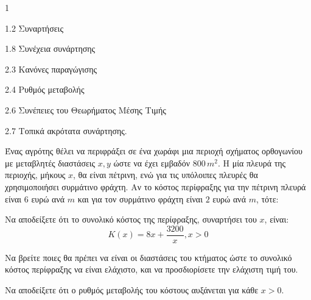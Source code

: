 \begin{ylh}{1}
    \item 1.2 Συναρτήσεις
    \item 1.8 Συνέχεια συνάρτησης
    \item 2.3 Κανόνες παραγώγισης
    \item 2.4 Ρυθμός μεταβολής
    \item 2.6 Συνέπειες του Θεωρήματος Μέσης Τιμής
    \item 2.7 Τοπικά ακρότατα συνάρτησης.
\end{ylh}
Ένας αγρότης θέλει να περιφράξει σε ένα χωράφι μια περιοχή σχήματος ορθογωνίου με μεταβλητές διαστάσεις $x, y$ ώστε να έχει εμβαδόν $800 \, m^2$. Η μία πλευρά της περιοχής, μήκους $x$, θα είναι πέτρινη, ενώ για τις υπόλοιπες πλευρές θα χρησιμοποιήσει συρμάτινο φράχτη. Αν το κόστος περίφραξης για την πέτρινη πλευρά είναι $6$ ευρώ ανά $m$ και για τον συρμάτινο φράχτη είναι $2$ ευρώ ανά $m$, τότε:
\begin{alist}
\item Να αποδείξετε ότι το συνολικό κόστος της περίφραξης, συναρτήσει του $x$, είναι:
\[ K(x) = 8x + \frac{3200}{x}, x > 0 \] 
\item Να βρείτε ποιες θα πρέπει να είναι οι διαστάσεις του κτήματος ώστε το συνολικό κόστος περίφραξης να είναι ελάχιστο, και να προσδιορίσετε την ελάχιστη τιμή του. 
\item Να αποδείξετε ότι ο ρυθμός μεταβολής του κόστους αυξάνεται για κάθε $x > 0$. 
\end{alist}